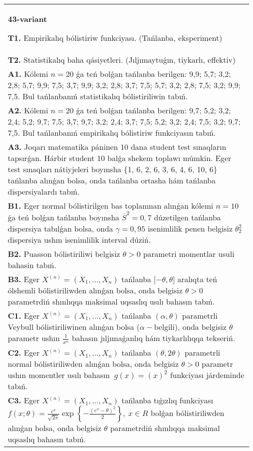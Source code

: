 \documentclass{article}
\begin{document}
\vspace{1cm}


\begin{tabular}{m{17cm}}
\textbf{43-variant}
\newline

\textbf{T1.} 
Empirikalıq bólistiriw funkciyası. (Tańlanba, eksperiment)
 \\
\textbf{T2.} 
Statistikalıq baha qásiyetleri. (Jıljımaytuǵın, tiykarlı, effektiv)
 \\
\textbf{A1.} 
Kólemi \(n = 20\) ǵa teń bolǵan tańlanba berilgen: 9,9; 5,7; 3,2; 2,8; 5,7; 9,9; 7,5; 3,7; 9,9; 3,2; 2,8; 3,7; 7,5; 5,7; 3,2; 2,8; 7,5; 3,2; 9,9; 7,5. Bul tańlanbanıń statistikalıq bólistiriliwin tabıń.
 \\
\textbf{A2.} 
Kólemi \(n = 20\) ǵa teń bolǵan tańlanba berilgen: 9,7; 5,2; 3,2; 2,4; 5,2; 9,7; 7,5; 3,7; 9,7; 3,2; 2,4; 3,7; 7,5; 5,2; 3,2; 2,4; 7,5; 3,2; 9,7; 7,5. Bul tańlanbanıń empirikalıq bólistiriw funkciyasın tabıń.
 \\
\textbf{A3.} 
Joqarı matematika páninen 10 dana student test sınaqların tapsırǵan. Hárbir student 10 balǵa shekem toplawı múmkin. Eger test sınaqları nátiyjeleri boyınsha \{1, 6, 2, 6, 3, 6, 4, 6, 10, 6\} tańlanba alınǵan bolsa, onda tańlanba ortasha hám tańlanba dispersiyalardı tabıń.
 \\
\textbf{B1.} 
Eger normal bólistirilgen bas toplamnan alınǵan kólemi \(n = 10\) ǵa teń bolǵan tańlanba boyınsha \({\overline{S}}^{2} = 0,7\) dúzetilgen tańlanba dispersiya tabılǵan bolsa, onda \(\gamma = 0,95\) isenimlilik penen belgisiz \(\theta_{2}^{2}\) dispersiya ushın isenimlilik interval dúziń.
 \\
\textbf{B2.} 
Puasson bólistiriliwi belgisiz \(\theta > 0\) parametri momentlar usuli bahasin tabıń.
 \\
\textbf{B3.} 
Eger \(X^{(n)} = \left( X_{1},...,X_{n} \right)\) tańlanba \(\lbrack - \theta,\theta\rbrack\) aralıqta teń ólshemli bólistiriliwden alınǵan bolsa, onda belgisiz \(\theta > 0\) parametrdiń shınlıqqa maksimal uqsaslıq usılı bahasın tabıń.
 \\
\textbf{C1.} 
Eger \(X^{(n)} = \left( X_{1},...,X_{n} \right)\) tańlanba \((\alpha,\theta)\) parametrli Veybull bólistiriliwinen alınǵan bolsa (\(\alpha -\)belgili), onda belgisiz \(\theta\) parametr ushın \(\frac{1}{\overline{x^{\alpha}}}\) bahasın jıljımaǵanlıq hám tiykarlılıqqa tekseriń.
 \\
\textbf{C2.} 
Eger \(X^{(n)} = \left( X_{1},...,X_{n} \right)\) tańlanba \((\theta,2\theta)\) parametrli normal bólistiriliwden alınǵan bolsa, onda belgisiz \(\theta > 0\) parametr ushın momentler usılı bahasın \({\ g(x) = (x)}^{2}\) funkciyası járdeminde tabıń.
 \\
\textbf{C3.} 
Eger \(X^{(n)} = \left( X_{1},...,X_{n} \right)\) tańlanba tıǵızlıq funkciyası
$f(x;\theta) = \frac{e^{x}}{\sqrt{2\pi}}\exp\left\{ - \frac{\left( e^{x} - \theta \right)^{2}}{2} \right\},\ x \in R$
bolǵan bólistiriliwden alınǵan bolsa, onda belgisiz \(\theta\) parametrdiń shınlıqqa maksimal uqsaslıq bahasın tabıń.
 \\

\end{tabular}
\vspace{1cm}
\end{document}
